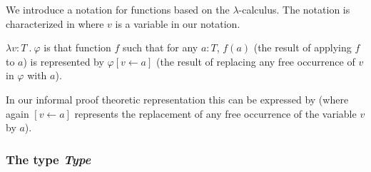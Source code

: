 We introduce a notation for functions based on the $\lambda$-calculus.
The notation is characterized in \nexteg{} where $v$ is a variable in
our notation.
\begin{ex} 
$\lambda v\!:\!T\ .\ \varphi$ is that function $f$ such that for any
$a:T$, $f(a)$ (the result of applying $f$ to $a$) is represented by
$\varphi[v\leftarrow a]$ (the result of replacing any free occurrence
of $v$ in $\varphi$ with $a$).
\label{ex:fun-notation}
\end{ex} 
In our informal proof theoretic representation this can be expressed
by \nexteg{} (where again $[v\leftarrow a]$ represents the replacement
of any free occurrence of the variable $v$ by $a$).
\begin{ex} 
\begin{subex} 
 
\item \begin{prooftree}
\end{prooftree} 
 
\item \begin{prooftree}
\end{prooftree} 
 
\end{subex} 
   
\end{ex} 
       

\subsubsection{The type \textit{Type}}
\label{sec:type-Type}  


